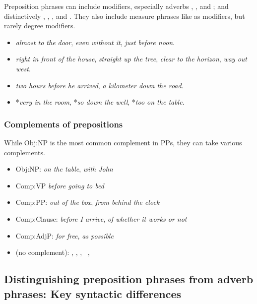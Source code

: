 Preposition phrases can include modifiers, especially adverbs , , and ; and distinctively , , , and . They also include measure phrases like  as modifiers, but rarely degree modifiers.

\begin{itemize}[noitemsep]
   \item \textit{\emph{almost} to the door}, \textit{\emph{even} without it},  \textit{\emph{just} before noon}.
   \item \textit{\emph{right} in front of the house}, \textit{\emph{straight} up the tree}, \textit{\emph{clear} to the horizon}, \textit{\emph{way} out west}.
   \item \textit{\emph{two hours} before he arrived}, \textit{\emph{a kilometer} down the road}.
   \item *\textit{\emph{very} in the room}, *\textit{\emph{so} down the well}, *\textit{\emph{too} on the table}.
\end{itemize}

\subsubsection*{Complements of prepositions}
\label{sec:PP-complementation}

While Obj:NP is the most common complement in PPs, they can take various complements.

\begin{itemize}[noitemsep]
   \item Obj:NP: \textit{on \emph{the table}}, \textit{with \emph{John}}
   \item Comp:VP \textit{before \emph{going to bed}}
   \item Comp:PP: \textit{out \emph{of the box}}, \textit{from \emph{behind the clock}}
   \item Comp:Clause: \textit{before \emph{I arrive}}, \textit{of \emph{whether it works or not}}
   \item Comp:AdjP: \textit{for \emph{free}}, \textit{as \emph{possible}}
   \item (no complement): , , , \, , 
\end{itemize}

\subsection{Distinguishing preposition phrases from adverb phrases: Key syntactic differences}
\label{sec:distinguishing-pps-advps}

